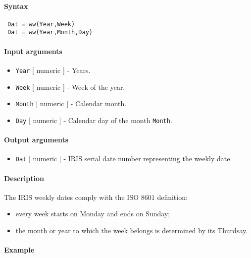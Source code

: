 


	\paragraph{Syntax}
 
 \begin{verbatim}
 Dat = ww(Year,Week)
 Dat = ww(Year,Month,Day)
 \end{verbatim}
 
 \paragraph{Input arguments}
 
 \begin{itemize}
 \item
   \texttt{Year} {[} numeric {]} - Years.
 \item
   \texttt{Week} {[} numeric {]} - Week of the year.
 \item
   \texttt{Month} {[} numeric {]} - Calendar month.
 \item
   \texttt{Day} {[} numeric {]} - Calendar day of the month
   \texttt{Month}.
 \end{itemize}
 
 \paragraph{Output arguments}
 
 \begin{itemize}
 \item
   \texttt{Dat} {[} numeric {]} - IRIS serial date number representing
   the weekly date.
 \end{itemize}
 
 \paragraph{Description}
 
 The IRIS weekly dates comply with the ISO 8601 definition:
 
 \begin{itemize}
 \item
   every week starts on Monday and ends on Sunday;
 \item
   the month or year to which the week belongs is determined by its
   Thurdsay.
 \end{itemize}
 
 \paragraph{Example}


